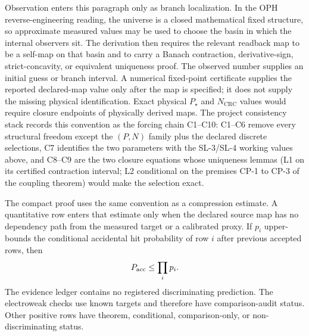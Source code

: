 Observation enters this paragraph only as branch localization. In the OPH reverse-engineering
reading, the universe is a closed mathematical fixed structure, so approximate measured
values may be used to choose the basin in which the internal observers sit. The derivation then
requires the relevant readback map to be a self-map on that basin and to carry a Banach
contraction, derivative-sign, strict-concavity, or equivalent uniqueness proof. The observed
number supplies an initial guess or branch interval. A numerical fixed-point certificate supplies
the reported declared-map value only after the map is specified; it does not supply the
missing physical identification. Exact physical \(P_\star\) and \(N_{\mathrm{CRC}}\) values would
require closure endpoints of physically derived maps.
The project consistency stack records this convention as the forcing chain
C1--C10: C1--C6 remove every structural freedom except the \((P,N)\) family plus the declared
discrete selections, C7 identifies the two parameters with the SL-3/SL-4 working values above, and
C8--C9 are the two closure equations whose uniqueness lemmas (L1 on its certified contraction
interval; L2 conditional on the premises CP-1 to CP-3 of the coupling theorem) would make the
selection exact.

The compact proof uses the same convention as a compression estimate. A quantitative row enters
that estimate only when the declared source map has no dependency path from the measured target or
a calibrated proxy. If \(p_i\) upper-bounds the conditional accidental hit probability of row \(i\)
after previous accepted rows, then
\[
P_{\rm acc}\le\prod_i p_i .
\]
The evidence ledger contains no registered discriminating prediction. The electroweak checks
use known targets and therefore have comparison-audit status. Other positive rows have theorem,
conditional, comparison-only, or non-discriminating status.

